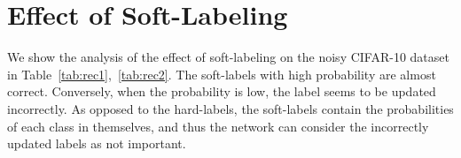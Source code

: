 \documentclass[10pt,twocolumn,letterpaper]{article}
\newcommand{\Tref}[1]{Table~\ref{#1}}
\begin{document}
\begin{table}[bt]
  \caption{Validation accuracy with different  (start epoch) and  (stop epoch) in the triple test (experimented on SN-CIFAR with noise rate , , , learning rate = 0.08).}
  \centering
  \label{tab:begin2}
\end{table}

\newpage
\section{Effect of Soft-Labeling}\label{sec:effect}
We show the analysis of the effect of soft-labeling on the noisy CIFAR-10 dataset in \Tref{tab:rec1},~\ref{tab:rec2}.
The soft-labels with high probability are almost correct.
Conversely, when the probability is low, the label seems to be updated incorrectly. As opposed to the hard-labels, the soft-labels contain the probabilities of each class in themselves, and thus the network can consider the incorrectly updated labels as not important.

\begin{table}[h]
  \caption{Recovery accuracies of the updated soft-labels whose maximum probabilities  are within each range (experimented on AN-CIFAR with noise rate ).}
  \centering
  \label{tab:rec1}
\end{table}

\begin{table}[h]
  \caption{Recovery accuracies of the updated soft-labels whose maximum probabilities  are within each range (experimented on SN-CIFAR with noise rate ).}
  \centering
  \label{tab:rec2}
\end{table}
\end{document}
